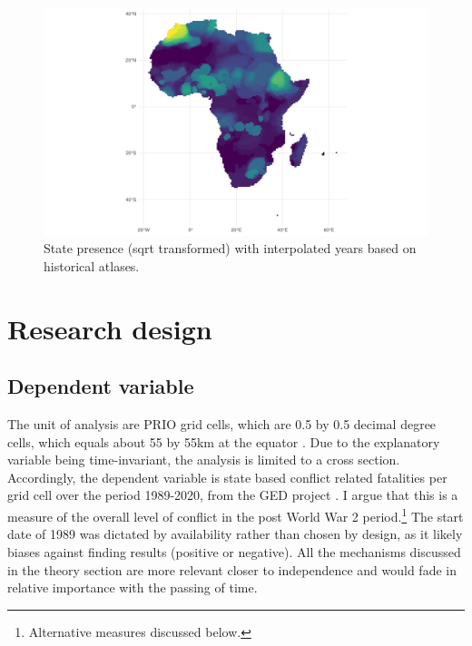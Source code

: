 \documentclass[12pt]{article}
\begin{document}

\begin{figure}[htpb]
	\centering
	\includegraphics[width=\linewidth]{../R/Output/sqrtSpAll.pdf}
	\caption{State presence (sqrt transformed) with interpolated years based
	on historical atlases.}
	\label{Sp_i}
\end{figure}



\section{Research design}

\subsection{Dependent variable}

The unit of analysis are PRIO grid cells, which are 0.5 by 0.5 decimal degree
cells, which equals about 55 by 55km at the equator \citep{Tollefsen2012}. Due
to the explanatory variable being time-invariant, the analysis is limited to a
cross section. Accordingly, the dependent variable is state based conflict
related fatalities per grid cell over the period 1989-2020, from the GED project
\citep{Sundberg2013}. I argue that this is a measure of the overall level of
conflict in the post World War 2 period.\footnote{Alternative measures discussed
below.} The start date of 1989 was dictated by availability rather than chosen
by design, as it likely biases against finding results (positive or negative).
All the mechanisms discussed in the theory section are more relevant
closer to independence and would fade in relative importance with the passing of
time.
\end{document}
